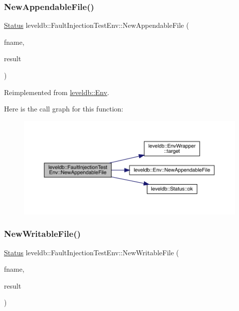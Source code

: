 \subsubsection{\texorpdfstring{NewAppendableFile()}{NewAppendableFile()}}
{\footnotesize\ttfamily \mbox{\hyperlink{classleveldb_1_1_status}{Status}} leveldb\+::\+Fault\+Injection\+Test\+Env\+::\+New\+Appendable\+File (\begin{DoxyParamCaption}\item[{const std\+::string \&}]{fname,  }\item[{\mbox{\hyperlink{classleveldb_1_1_writable_file}{Writable\+File}} $\ast$$\ast$}]{result }\end{DoxyParamCaption})\hspace{0.3cm}{\ttfamily [virtual]}}



Reimplemented from \mbox{\hyperlink{classleveldb_1_1_env_a77886b6f8f8b5df8e40057be234a3b5d}{leveldb\+::\+Env}}.

Here is the call graph for this function\+:
\nopagebreak
\begin{figure}[H]
\begin{center}
\leavevmode
\includegraphics[width=350pt]{classleveldb_1_1_fault_injection_test_env_ab3147789bfa49d4a50a06e7c2a1628ef_cgraph}
\end{center}
\end{figure}
\mbox{\label{classleveldb_1_1_fault_injection_test_env_a1e89cf48116748a2f7d8c07022eab4f7}} 
\subsubsection{\texorpdfstring{NewWritableFile()}{NewWritableFile()}}
{\footnotesize\ttfamily \mbox{\hyperlink{classleveldb_1_1_status}{Status}} leveldb\+::\+Fault\+Injection\+Test\+Env\+::\+New\+Writable\+File (\begin{DoxyParamCaption}\item[{const std\+::string \&}]{fname,  }\item[{\mbox{\hyperlink{classleveldb_1_1_writable_file}{Writable\+File}} $\ast$$\ast$}]{result }\end{DoxyParamCaption})\hspace{0.3cm}{\ttfamily [virtual]}}



